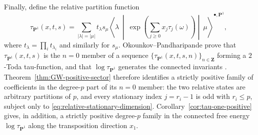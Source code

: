 \documentclass[10pt,a4paper]{amsart}
\numberwithin{equation}{section}
\begin{document}
Finally, define the relative partition function
\begin{equation}\label{eq:relative-GW-partition-function}
 \tau_{\mathbf P^1}(x,t,s)
 =\sum_{|\lambda|=|\mu|}t_\lambda s_\mu
 \left\langle\lambda\ \middle|\
 \exp\!\left(\sum_{j\geq0}x_j\tau_j(\omega)\right)
 \middle|\ \mu\right\rangle^{\bullet,\mathbf P^1},
\end{equation}
where $t_\lambda=\prod_i t_{\lambda_i}$ and similarly for $s_\mu$.
Okounkov--Pandharipande prove that $\tau_{\mathbf P^1}(x,t,s)$ is the
$n=0$ member of a sequence
$\{\tau_{\mathbf P^1}(x,t,s,n)\}_{n\in\mathbf Z}$ forming a $2$-Toda
tau-function, and that $\log\tau_{\mathbf P^1}$ generates the connected invariants
\cite[Section~4, especially equations~(4.1)--(4.2) and Theorem~4]
{OkounkovPandharipande}.  Theorem~\ref{thm:GW-positive-sector} therefore
identifies a strictly positive family of coefficients in the degree-$p$
part of its $n=0$ member: the two relative states are
arbitrary partitions of $p$, and every stationary index $j=r_i-1$ is odd
with $r_i\leq p$, subject only to
\eqref{eq:relative-stationary-dimension}.  Corollary~\ref{cor:tau-one-positive}
gives, in addition, a strictly positive degree-$p$ family in the connected
free energy $\log\tau_{\mathbf P^1}$ along the transposition direction
$x_1$.
\end{document}
